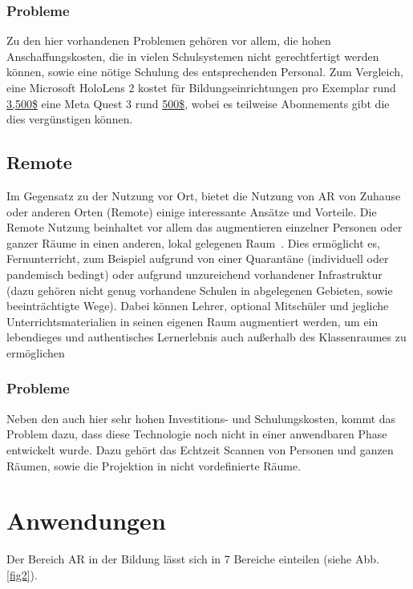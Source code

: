 \documentclass[conference]{IEEEtran}
\begin{document}
\subsubsection*{Probleme}
Zu den hier vorhandenen Problemen gehören vor allem, die hohen Anschaffungskosten, die in vielen Schulsystemen nicht gerechtfertigt
werden können, sowie eine nötige Schulung des entsprechenden Personal. Zum Vergleich, eine Microsoft HoloLens 2 kostet für Bildungseinrichtungen
pro Exemplar rund \href{https://techcommunity.microsoft.com/t5/mixed-reality-blog/education-institutions-save-10-on-microsoft-hololens-2/ba-p/3282493}{3,500\$}
eine Meta Quest 3 rund \href{https://www.meta.com/de/en/quest/quest-3/#}{500\$}, wobei es teilweise Abonnements gibt die dies vergünstigen
können.
\subsection{Remote}
Im Gegensatz zu der Nutzung vor Ort, bietet die Nutzung von AR von Zuhause oder anderen Orten (Remote) einige interessante Ansätze 
und Vorteile. Die Remote Nutzung beinhaltet vor allem das augmentieren einzelner Personen oder ganzer Räume in einen anderen, lokal
gelegenen Raum \cite{b5}. Dies ermöglicht es, Fernunterricht, zum Beispiel aufgrund von einer Quarantäne (individuell oder pandemisch bedingt)
oder aufgrund unzureichend vorhandener Infrastruktur (dazu gehören nicht genug vorhandene Schulen in abgelegenen Gebieten, sowie 
beeinträchtigte Wege). Dabei können Lehrer, optional Mitschüler und jegliche Unterrichtsmaterialien in seinen eigenen Raum 
augmentiert werden, um ein lebendieges und authentisches Lernerlebnis auch außerhalb des Klassenraumes zu ermöglichen
\subsubsection*{Probleme}
Neben den auch hier sehr hohen Investitions- und Schulungskosten, kommt das Problem dazu, dass diese Technologie noch nicht in einer 
anwendbaren Phase entwickelt wurde. Dazu gehört das Echtzeit Scannen von Personen und ganzen Räumen, sowie die Projektion in nicht
vordefinierte Räume.

\section{Anwendungen}
Der Bereich AR in der Bildung lässt sich in 7 Bereiche einteilen (siehe Abb. \ref{fig2}).
\end{document}
